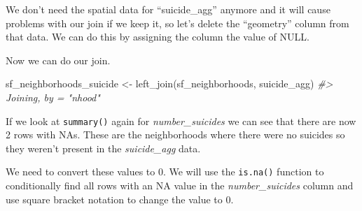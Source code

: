 \documentclass[
]{krantz}
\makeatletter
\newenvironment{Shaded}{\begin{snugshade}}{\end{snugshade}}
\newcommand{\CommentTok}[1]{\textcolor[rgb]{0.37,0.37,0.37}{\textit{#1}}}
\newcommand{\ConstantTok}[1]{\textcolor[rgb]{0,0,0}{#1}}
\newcommand{\DecValTok}[1]{\textcolor[rgb]{0.06,0.06,0.06}{#1}}
\newcommand{\FunctionTok}[1]{\textcolor[rgb]{0,0,0}{#1}}
\newcommand{\NormalTok}[1]{#1}
\newcommand{\OtherTok}[1]{\textcolor[rgb]{0.37,0.37,0.37}{#1}}
\newcommand{\SpecialCharTok}[1]{\textcolor[rgb]{0,0,0}{#1}}
\newenvironment{kframe}{%
\medskip{}
\setlength{\fboxsep}{.8em}
 \def\at@end@of@kframe{}%
 \ifinner\ifhmode%
  \def\at@end@of@kframe{\end{minipage}}%
  \begin{minipage}{\columnwidth}%
 \fi\fi%
 \def\FrameCommand##1{\hskip\@totalleftmargin \hskip-\fboxsep
 \colorbox{shadecolor}{##1}\hskip-\fboxsep
     \hskip-\linewidth \hskip-\@totalleftmargin \hskip\columnwidth}%
 \MakeFramed {\advance\hsize-\width
   \@totalleftmargin\z@ \linewidth\hsize
   \@setminipage}}%
 {\par\unskip\endMakeFramed%
 \at@end@of@kframe}
\renewenvironment{Shaded}{\begin{kframe}}{\end{kframe}}
\makeatother
\begin{document}
We don't need the spatial data for ``suicide\_agg'' anymore and it will cause problems with our join if we keep it, so let's delete the ``geometry'' column from that data. We can do this by assigning the column the value of NULL.

\begin{Shaded}
\end{Shaded}

Now we can do our join.

\begin{Shaded}
\begin{Highlighting}[]
\NormalTok{sf\_neighborhoods\_suicide }\OtherTok{\textless{}{-}} \FunctionTok{left\_join}\NormalTok{(sf\_neighborhoods, suicide\_agg)}
\CommentTok{\#\textgreater{} Joining, by = "nhood"}
\end{Highlighting}
\end{Shaded}

If we look at \texttt{summary()} again for \emph{number\_suicides} we can see that there are now 2 rows with NAs. These are the neighborhoods where there were no suicides so they weren't present in the \emph{suicide\_agg} data.

\begin{Shaded}
\end{Shaded}

We need to convert these values to 0. We will use the \texttt{is.na()} function to conditionally find all rows with an NA value in the \emph{number\_suicides} column and use square bracket notation to change the value to 0.

\begin{Shaded}
\end{Shaded}
\end{document}
